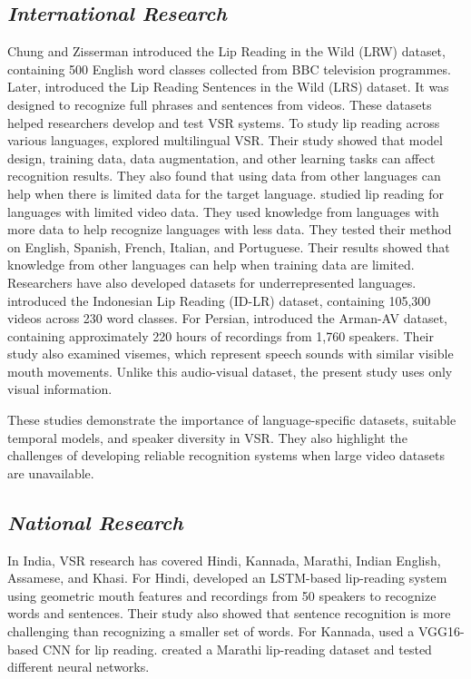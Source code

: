 \documentclass[journal]{IEEEtran}
\begin{document}
\subsection{\textit{International Research}}

Chung and Zisserman \cite{chung2016lipreading} introduced the Lip Reading in the Wild (LRW) dataset, containing 500 English word classes collected from BBC television programmes. Later, \cite{chung2017sentences} introduced the Lip Reading Sentences in the Wild (LRS) dataset. It was designed to recognize full phrases and sentences from videos. These datasets helped researchers develop and test VSR systems. To study lip reading across various languages, \cite{ma2022multilingualvsr} explored multilingual VSR. Their study showed that model design, training data, data augmentation, and other learning tasks can affect recognition results. They also found that using data from other languages can help when there is limited data for the target language.
\cite{kim2023lowresource} studied lip reading for languages with limited video data. They used knowledge from languages with more data to help recognize languages with less data. They tested their method on English, Spanish, French, Italian, and Portuguese. Their results showed that knowledge from other languages can help when training data are limited.
Researchers have also developed datasets for underrepresented languages. \cite{rahmatullah2024idlr} introduced the Indonesian Lip Reading (ID-LR) dataset, containing 105,300 videos across 230 word classes. For Persian, \cite{peymanfard2024armanav} introduced the Arman-AV dataset, containing approximately 220 hours of recordings from 1,760 speakers. Their study also examined visemes, which represent speech sounds with similar visible mouth movements. Unlike this audio-visual dataset, the present study uses only visual information.

These studies demonstrate the importance of language-specific datasets, suitable temporal models, and speaker diversity in VSR. They also highlight the challenges of developing reliable recognition systems when large video datasets are unavailable.

\subsection{\textit{National Research}}

In India, VSR research has covered Hindi, Kannada, Marathi, Indian English, Assamese, and Khasi. For Hindi, \cite{patil2019hindi} developed an LSTM-based lip-reading system using geometric mouth features and recordings from 50 speakers to recognize words and sentences. Their study also showed that sentence recognition is more challenging than recognizing a smaller set of words. For Kannada, \cite{rudregowda2023kannada} used a VGG16-based CNN for lip reading. \cite{kulkarni2024marathi} created a Marathi lip-reading dataset and tested different neural networks.
\end{document}
